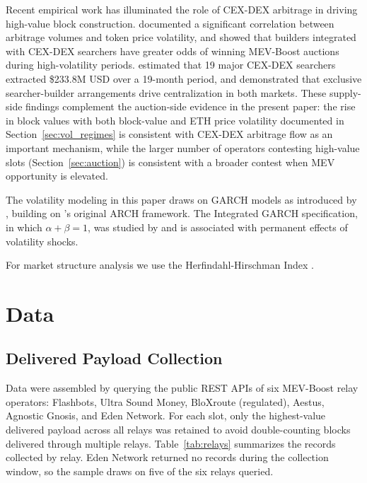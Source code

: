 \documentclass[11pt]{article}
\begin{document}
Recent empirical work has illuminated the role of CEX-DEX arbitrage in driving
high-value block construction. \citet{heimbach2024} documented a significant
correlation between arbitrage volumes and token price volatility, and showed
that builders integrated with CEX-DEX searchers have greater odds of winning
MEV-Boost auctions during high-volatility periods. \citet{wu2025} estimated that
19 major CEX-DEX searchers extracted \$233.8M USD over a 19-month period, and
demonstrated that exclusive searcher-builder arrangements drive centralization
in both markets. These supply-side findings complement the auction-side evidence
in the present paper: the rise in block values with both block-value and ETH
price volatility documented in Section~\ref{sec:vol_regimes} is consistent with CEX-DEX arbitrage flow as
an important mechanism, while the larger number of operators contesting high-value slots
(Section~\ref{sec:auction}) is consistent with a broader contest when MEV opportunity is elevated.

The volatility modeling in this paper draws on GARCH models as introduced by
\citet{bollerslev1986}, building on \citet{engle1982}'s original ARCH framework.
The Integrated GARCH specification, in which $\alpha + \beta = 1$, was studied
by \citet{engle_bollerslev1986} and is associated with permanent effects of
volatility shocks.

For market structure analysis we use the Herfindahl-Hirschman Index
\citep{hirschman1945}.

\section{Data}
\label{sec:data}

\subsection{Delivered Payload Collection}

Data were assembled by querying the public REST APIs of six MEV-Boost relay
operators: Flashbots, Ultra Sound Money, BloXroute (regulated), Aestus,
Agnostic Gnosis, and Eden Network. For each slot, only the highest-value
delivered payload across all relays was retained to avoid double-counting blocks
delivered through multiple relays. Table~\ref{tab:relays} summarizes the records
collected by relay. Eden Network returned no records during the collection
window, so the sample draws on five of the six relays queried.
\end{document}

